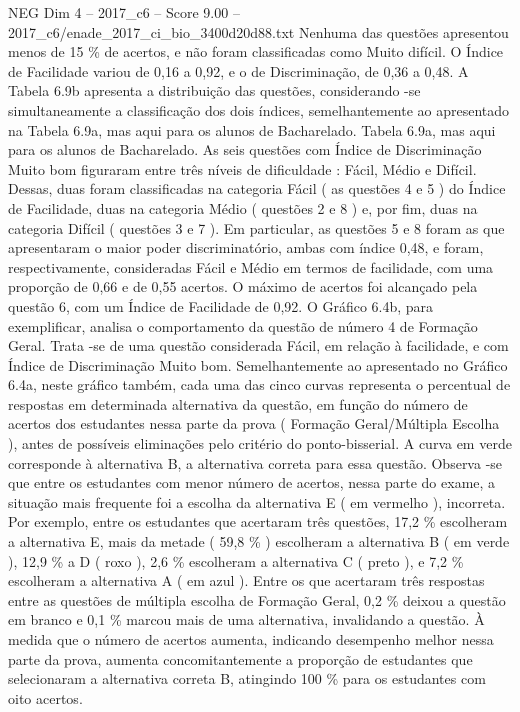 \begin{textsample}{NEG Dim 4 – 2017\_c6 – Score 9.00 – 2017\_c6/enade\_2017\_ci\_bio\_3400d20d88.txt}
Nenhuma das questões apresentou menos de 15 \% de acertos, e não foram classificadas como Muito difícil.
O Índice de Facilidade variou de 0,16 a 0,92, e o de Discriminação, de 0,36 a 0,48.
A Tabela 6.9b apresenta a distribuição das questões, considerando -se simultaneamente a classificação dos dois índices, semelhantemente ao apresentado na Tabela 6.9a, mas aqui para os alunos de Bacharelado.
Tabela 6.9a, mas aqui para os alunos de Bacharelado.
As seis questões com Índice de Discriminação Muito bom figuraram entre três níveis de dificuldade : Fácil, Médio e Difícil.
Dessas, duas foram classificadas na categoria Fácil ( as questões 4 e 5 ) do Índice de Facilidade, duas na categoria Médio ( questões 2 e 8 ) e, por fim, duas na categoria Difícil ( questões 3 e 7 ).
Em particular, as questões 5 e 8 foram as que apresentaram o maior poder discriminatório, ambas com índice 0,48, e foram, respectivamente, consideradas Fácil e Médio em termos de facilidade, com uma proporção de 0,66 e de 0,55 acertos.
O máximo de acertos foi alcançado pela questão 6, com um Índice de Facilidade de 0,92.
O Gráfico 6.4b, para exemplificar, analisa o comportamento da questão de número 4 de Formação Geral.
Trata -se de uma questão considerada Fácil, em relação à facilidade, e com Índice de Discriminação Muito bom.
Semelhantemente ao apresentado no Gráfico 6.4a, neste gráfico também, cada uma das cinco curvas representa o percentual de respostas em determinada alternativa da questão, em função do número de acertos dos estudantes nessa parte da prova ( Formação Geral/Múltipla Escolha ), antes de possíveis eliminações pelo critério do ponto-bisserial.
A curva em verde corresponde à alternativa B, a alternativa correta para essa questão.
Observa -se que entre os estudantes com menor número de acertos, nessa parte do exame, a situação mais frequente foi a escolha da alternativa E ( em vermelho ), incorreta.
Por exemplo, entre os estudantes que acertaram três questões, 17,2 \% escolheram a alternativa E, mais da metade ( 59,8 \% ) escolheram a alternativa B ( em verde ), 12,9 \% a D ( roxo ), 2,6 \% escolheram a alternativa C ( preto ), e 7,2 \% escolheram a alternativa A ( em azul ).
Entre os que acertaram três respostas entre as questões de múltipla escolha de Formação Geral, 0,2 \% deixou a questão em branco e 0,1 \% marcou mais de uma alternativa, invalidando a questão.
À medida que o número de acertos aumenta, indicando desempenho melhor nessa parte da prova, aumenta concomitantemente a proporção de estudantes que selecionaram a alternativa correta B, atingindo 100 \% para os estudantes com oito acertos.

\end{textsample}
